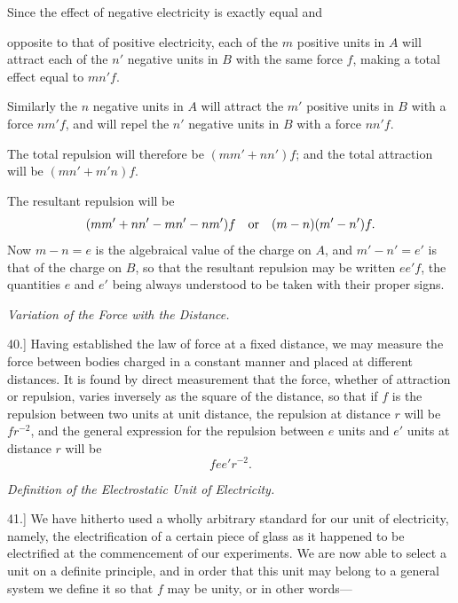 \documentclass[11pt,a4paper]{article}
\begin{document}
Since the effect of negative electricity is exactly equal and

\clearpage
\setcounter{footnote}{0}

opposite to that of positive electricity, each of the \(m\) positive
units in \(A\) will attract each of the \(n'\) negative units in \(B\)
with the same force \(f\), making a total effect equal to \(m n' f\).

Similarly the \(n\) negative units in \(A\) will attract the \(m'\)
positive units in \(B\) with a force \(n m' f\), and will repel the
\(n'\) negative units in \(B\) with a force \(n n' f\).

The total repulsion will therefore be \((m m' + n n')f\); and the total
attraction will be \((m n' + m' n)f\).

The resultant repulsion will be
\[
  (m m' + n n' - m n' - n m')f
  \quad\hbox{or}\quad
  (m - n)(m' - n')f.
\]
Now \(m - n = e\) is the algebraical value of the charge on \(A\), and
\(m' - n' = e'\) is that of the charge on \(B\), so that the resultant
repulsion may be written \(e e' f\), the quantities \(e\) and \(e'\)
being always understood to be taken with their proper signs.

\begin{center}
\textit{Variation of the Force with the Distance.}
\end{center}

40.] Having established the law of force at a fixed distance, we may
measure the force between bodies charged in a constant manner and placed
at different distances. It is found by direct measurement that the
force, whether of attraction or repulsion, varies inversely as the
square of the distance, so that if \(f\) is the repulsion between two
units at unit distance, the repulsion at distance \(r\) will be
\(f r^{-2}\), and the general expression for the repulsion between
\(e\) units and \(e'\) units at distance \(r\) will be
\[
  f e e' r^{-2}.
\]

\begin{center}
\textit{Definition of the Electrostatic Unit of Electricity.}
\end{center}

41.] We have hitherto used a wholly arbitrary standard for our unit of
electricity, namely, the electrification of a certain piece of glass as
it happened to be electrified at the commencement of our experiments.
We are now able to select a unit on a definite principle, and in order
that this unit may belong to a general system we define it so that \(f\)
may be unity, or in other words---
\end{document}
